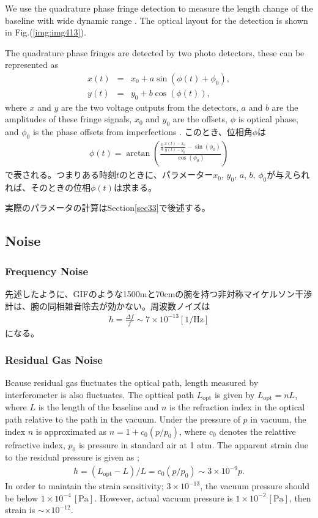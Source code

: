 We use the quadrature phase fringe detection to measure the length change of the baseline with wide dynamic range \cite{bobroff1993recent}. The optical layout for the detection is shown in Fig.(\ref{img:img413}).

The quadrature phase fringes are detected by two photo detectors, these can be represented as
\begin{eqnarray}
  x(t) &=& x_0 + a \sin(\phi(t)+\phi_0), \\
  y(t) &=& y_0 + b \cos(\phi(t)),
\end{eqnarray}
where $x$ and $y$ are the two voltage outputs from the detectors, $a$ and $b$ are the amplitudes of these fringe signals, $x_0$ and $y_0$ are the offsets, $\phi$ is optical phase, and $\phi_0$ is the phase offsets from imperfections \cite{zumberge2004resolving}.
このとき、位相角$\phi$は
\begin{eqnarray}
  \phi(t) = \arctan{\left(\displaystyle\frac{\frac{b}{a}\frac{x(t)-x_0}{y(t)-y_0}-\sin(\phi_0)}{\cos(\phi_0)}\right)}
\end{eqnarray}
で表される。つまりある時刻$t$のときに、パラメーター$x_0,\,y_0,\,a,\,b,\,\phi_0$が与えられれば、そのときの位相$\phi(t)$は求まる。

実際のパラメータの計算はSection\ref{sec33}で後述する。

\subsection{Noise}
\subsubsection{Frequency Noise}
先述したように、GIFのような1500mと70cmの腕を持つ非対称マイケルソン干渉計は、腕の同相雑音除去が効かない。周波数ノイズは
\begin{eqnarray}
  h = \frac{\Delta{f}}{f} \sim 7\times10^{-13} [\mathrm{1/\mathrm{Hz}}]
\end{eqnarray}
になる\cite{araya2017design}。

\subsubsection{Residual Gas Noise}
Bcause residual gas fluctuates the optical path, length measured by interferometer is also fluctuates. The opttical path $L_{\mathrm{opt}}$ is given by $L_{\mathrm{opt}}=nL$, where $L$ is the length of the baseline and $n$ is the refraction index in the optical path relative to the path in the vacuum. Under the pressure of $p$ in vacuum, the index $n$ is approximated as $n = 1 + c_0(p/p_0)$, where $c_0$ denotes the relattive refractive index, $p_0$ is pressure in standard air at 1 atm. The apparent strain due to the residual pressure is given as \cite{ciddor1996refractive};
\begin{eqnarray}
  h = (L_{\mathrm{opt}}-L)/L = c_0(p/p_0) \sim 3\times10^{-9} p.
\end{eqnarray}
In order to maintain the strain sensitivity; $3\times10^{-13}$, the vacuum pressure should be below $1\times10^{-4}\,[\mathrm{Pa}]$. However, actual vacuum pressure is $1\times10^{-2}\,[\mathrm{Pa}]$, then strain is $\sim\times10^{-12}$.

